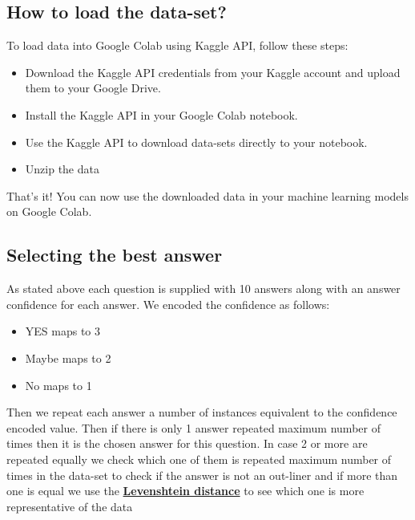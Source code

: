 \documentclass{report}
\begin{document}
\subsection{How to load the data-set?}
To load data into Google Colab using Kaggle API, follow these steps:

\begin{itemize}
\item Download the Kaggle API credentials from your Kaggle account and upload them to your Google Drive.
\item Install the Kaggle API in your Google Colab notebook.
\item Use the Kaggle API to download data-sets directly to your notebook.
\item Unzip the data
\end{itemize}

That's it! You can now use the downloaded data in your machine learning models on Google Colab.


\subsection{Selecting the best answer}
As stated above each question is supplied with 10 answers along with an answer confidence for each answer. We encoded the confidence as follows:

\begin{itemize}
\item YES maps to 3
\item Maybe maps to 2
\item No maps to 1
\end{itemize}

Then we repeat each answer a number of instances equivalent to the confidence encoded value. Then if there is only 1 answer repeated maximum number of times then it is the chosen answer for this question. In case 2 or more are repeated equally we check which one of them is repeated maximum number of times in the data-set to check if the answer is not an out-liner and if more than one is equal we use the \href{https://medium.com/@ethannam/understanding-the-levenshtein-distance-equation-for-beginners-c4285a5604f0#:~:text=The%20Levenshtein%20distance%20is%20a,change%20one%20into%20the%20other.}{\textbf{Levenshtein distance}} to see which one is more representative of the data
\end{document}
